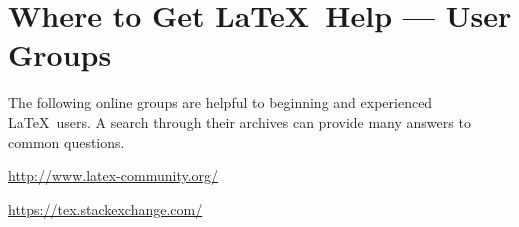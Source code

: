 \documentclass[lettersize,journal]{IEEEtran}
\begin{document}








\section{Where to Get \LaTeX \ Help --- User Groups}
The following online groups are helpful to beginning and experienced \LaTeX\ users. A search through their archives can provide many answers to common questions.
\begin{list}{}{}
\item{\url{http://www.latex-community.org/}} 
\item{\url{https://tex.stackexchange.com/} }
\end{list}
\end{document}
